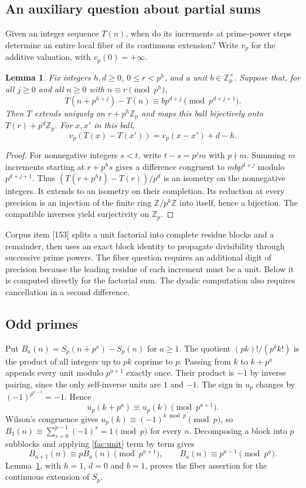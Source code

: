 \documentclass[11pt]{article}
\newtheorem{lemma}[theorem]{Lemma}
\theoremstyle{remark}\newtheorem{remark}[theorem]{Remark}
\begin{document}
\subsection{An auxiliary question about partial sums}
Given an integer sequence $T(n)$, when do its increments at prime-power
steps determine an entire local fiber of its continuous extension?
Write $v_p$ for the additive valuation, with $v_p(0)=+\infty$.

\begin{lemma}\label{fac:fiber}
Fix integers $h,d\ge0$, $0\le r<p^h$, and a unit $b\in\mathbb Z_p^\times$.
Suppose that, for all $j\ge0$ and all $n\ge0$ with $n\equiv r\pmod{p^h}$,
\[
 T(n+p^{h+j})-T(n)\equiv b p^{d+j}\pmod{p^{d+j+1}}.
\]
Then $T$ extends uniquely on $r+p^h\mathbb Z_p$ and maps this ball
bijectively onto $T(r)+p^d\mathbb Z_p$. For $x,x'$ in this ball,
\[
 v_p(T(x)-T(x'))=v_p(x-x')+d-h.
\]
\end{lemma}
\begin{proof}
For nonnegative integers $s<t$, write $t-s=p^j m$ with $p\nmid m$.
Summing $m$ increments starting at $r+p^hs$ gives a difference
congruent to $mbp^{d+j}$ modulo $p^{d+j+1}$.
Thus $(T(r+p^ht)-T(r))/p^d$ is an isometry on the nonnegative integers.
It extends to an isometry on their completion. Its reduction at every
precision is an injection of the finite ring $\mathbb Z/p^k\mathbb Z$
into itself, hence a bijection. The compatible inverses yield
surjectivity on $\mathbb Z_p$.
\end{proof}

Corpus item [153] splits a unit factorial into complete residue blocks
and a remainder, then uses an exact block identity to propagate
divisibility through successive prime powers. The fiber question
requires an additional digit of precision because the leading residue of each
increment must be a unit. Below it is computed directly for the
factorial sum. The dyadic computation also requires cancellation in a
second difference.

\subsection{Odd primes}
Put $B_a(n)=S_p(n+p^a)-S_p(n)$ for $a\ge1$.
The quotient $(pk)!/(p^kk!)$ is the product of all integers up to $pk$
coprime to $p$. Passing from $k$ to $k+p^a$ appends every unit modulo
$p^{a+1}$ exactly once. Their product is $-1$ by inverse pairing, since the only self-inverse units are $1$ and $-1$. The sign in $u_p$
changes by $(-1)^{p^{a-1}}=-1$. Hence
\begin{equation}\label{fac:unit}
 u_p(k+p^a)\equiv u_p(k)\pmod{p^{a+1}}.
\end{equation}
Wilson's congruence gives $u_p(k)\equiv(-1)^{k\bmod p}\pmod p$,
so $B_1(n)\equiv\sum_{s=0}^{p-1}(-1)^s=1\pmod p$ for every $n$.
Decomposing a block into $p$ subblocks and applying \eqref{fac:unit}
term by term gives
\[
 B_{a+1}(n)\equiv p B_a(n)\pmod{p^{a+1}},\qquad
 B_a(n)\equiv p^{a-1}\pmod{p^a}.
\]
Lemma~\ref{fac:fiber}, with $h=1$, $d=0$ and $b=1$, proves the
fiber assertion for the continuous extension of $S_p$.
\end{document}
